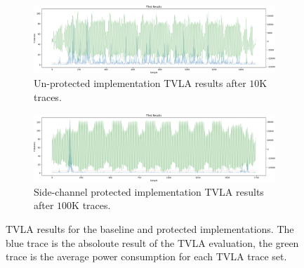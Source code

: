 \begin{figure}
\centering
\begin{subfigure}[t]{0.95\textwidth}
\centering
\includegraphics[width=\textwidth]{graphs/aes-vanilla-enc-default-ttest.png}
\caption{
    Un-protected implementation TVLA results after $10$K traces.
}
\label{fig:sca:unprotected}
\end{subfigure}
\begin{subfigure}[t]{0.95\textwidth}
\centering
\includegraphics[width=\textwidth]{graphs/aes-secure-enc-default-ttest.png}
\caption{
    Side-channel protected implementation TVLA results after $100$K traces.
}
\label{fig:sca:protected}
\end{subfigure}
\caption{
TVLA results for the baseline and protected implementations.
The blue trace is the absoloute result of the TVLA evaluation, the green
trace is the average power consumption for each TVLA trace set.
}
\end{figure}
